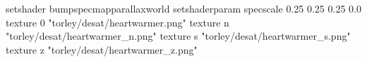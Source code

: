 setshader bumpspecmapparallaxworld
setshaderparam specscale 0.25 0.25 0.25 0.0
texture 0 "torley/desat/heartwarmer.png"
texture n "torley/desat/heartwarmer_n.png"
texture s "torley/desat/heartwarmer_s.png"
texture z "torley/desat/heartwarmer_z.png"

